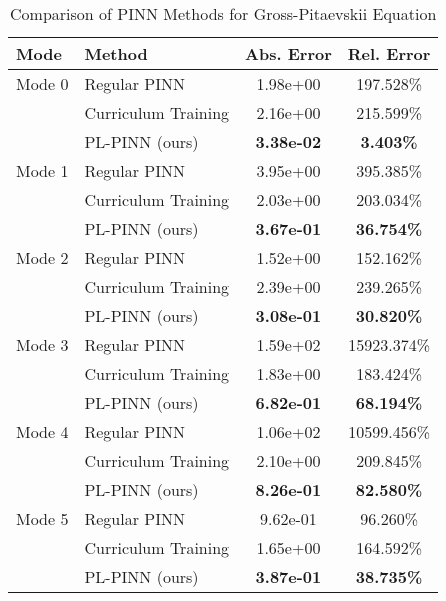 \begin{table}[htbp]
\centering
\caption{Comparison of PINN Methods for Gross-Pitaevskii Equation}
\label{tab:pinn_comparison}
\begin{tabular}{llcc}
\toprule
Mode & Method & Abs. Error & Rel. Error \\
\midrule
Mode 0 & Regular PINN & 1.98e+00 & 197.528\% \\
 & Curriculum Training & 2.16e+00 & 215.599\% \\
 & PL-PINN (ours) & \textbf{3.38e-02} & \textbf{3.403\%} \\
\midrule
Mode 1 & Regular PINN & 3.95e+00 & 395.385\% \\
 & Curriculum Training & 2.03e+00 & 203.034\% \\
 & PL-PINN (ours) & \textbf{3.67e-01} & \textbf{36.754\%} \\
\midrule
Mode 2 & Regular PINN & 1.52e+00 & 152.162\% \\
 & Curriculum Training & 2.39e+00 & 239.265\% \\
 & PL-PINN (ours) & \textbf{3.08e-01} & \textbf{30.820\%} \\
\midrule
Mode 3 & Regular PINN & 1.59e+02 & 15923.374\% \\
 & Curriculum Training & 1.83e+00 & 183.424\% \\
 & PL-PINN (ours) & \textbf{6.82e-01} & \textbf{68.194\%} \\
\midrule
Mode 4 & Regular PINN & 1.06e+02 & 10599.456\% \\
 & Curriculum Training & 2.10e+00 & 209.845\% \\
 & PL-PINN (ours) & \textbf{8.26e-01} & \textbf{82.580\%} \\
\midrule
Mode 5 & Regular PINN & 9.62e-01 & 96.260\% \\
 & Curriculum Training & 1.65e+00 & 164.592\% \\
 & PL-PINN (ours) & \textbf{3.87e-01} & \textbf{38.735\%} \\
\bottomrule
\end{tabular}
\end{table}